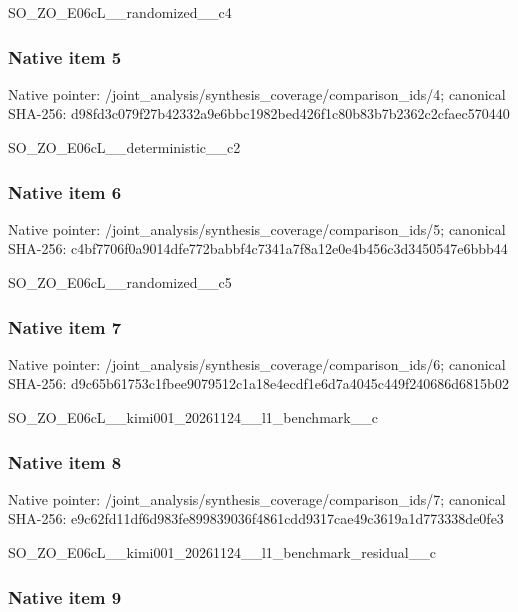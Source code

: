 \documentclass[10pt,a4paper]{article}
\begin{document}
SO\_ZO\_E06cL\_\_randomized\_\_c4


\subsubsection{Native item 5}


Native pointer: /joint\_analysis/synthesi\allowbreak{}s\_coverage/comparison\_id\allowbreak{}s/4; canonical SHA-256: d98fd3c079f27b42332a9e6b\allowbreak{}bc1982bed426f1c80b83b7b2\allowbreak{}362c2cfaec570440


SO\_ZO\_E06cL\_\_deterministic\_\_c2


\subsubsection{Native item 6}


Native pointer: /joint\_analysis/synthesi\allowbreak{}s\_coverage/comparison\_id\allowbreak{}s/5; canonical SHA-256: c4bf7706f0a9014dfe772bab\allowbreak{}bf4c7341a7f8a12e0e4b456c\allowbreak{}3d3450547e6bbb44


SO\_ZO\_E06cL\_\_randomized\_\_c5


\subsubsection{Native item 7}


Native pointer: /joint\_analysis/synthesi\allowbreak{}s\_coverage/comparison\_id\allowbreak{}s/6; canonical SHA-256: d9c65b61753c1fbee9079512\allowbreak{}c1a18e4ecdf1e6d7a4045c44\allowbreak{}9f240686d6815b02


SO\_ZO\_E06cL\_\_kimi001\_202\allowbreak{}61124\_\_l1\_benchmark\_\_c


\subsubsection{Native item 8}


Native pointer: /joint\_analysis/synthesi\allowbreak{}s\_coverage/comparison\_id\allowbreak{}s/7; canonical SHA-256: e9c62fd11df6d983fe899839\allowbreak{}036f4861cdd9317cae49c361\allowbreak{}9a1d773338de0fe3


SO\_ZO\_E06cL\_\_kimi001\_202\allowbreak{}61124\_\_l1\_benchmark\_resi\allowbreak{}dual\_\_c


\subsubsection{Native item 9}
\end{document}
